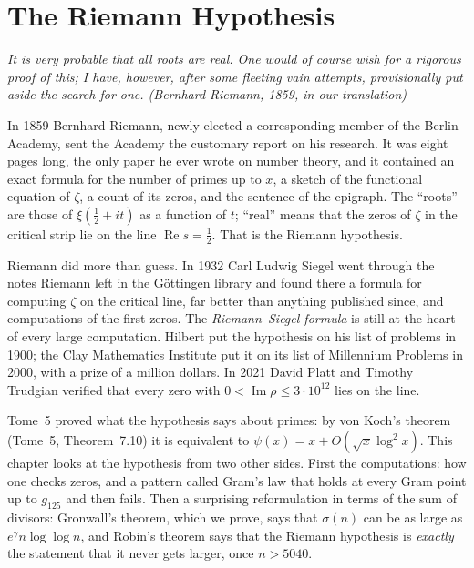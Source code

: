 \chapter{The Riemann Hypothesis}\label{conjectures:ch:riemann}

\begin{center}\itshape
It is very probable that all roots are real. One would of course wish for a rigorous proof of this; I have, however, after some fleeting vain attempts,
provisionally put aside the search for one.
\upshape(Bernhard Riemann, 1859, in our translation)
\end{center}

In 1859 Bernhard Riemann, newly elected a corresponding member of the Berlin Academy, sent the Academy the customary report on his research. It was
eight pages long, the only paper he ever wrote on number theory, and it contained an exact formula for the number of primes up to $x$, a sketch of
the functional equation of $\zeta$, a count of its zeros, and the sentence of the epigraph. The ``roots'' are those of $\xi(\frac12+it)$ as a function of
$t$; ``real'' means that the zeros of $\zeta$ in the critical strip lie on the line $\operatorname{Re}s=\frac12$. That is the Riemann hypothesis.

Riemann did more than guess. In 1932 Carl Ludwig Siegel went through the notes Riemann left in the G\"ottingen library and found there a formula for
computing $\zeta$ on the critical line, far better than anything published since, and computations of the first zeros. The \emph{Riemann--Siegel
formula} is still at the heart of every large computation. Hilbert put the hypothesis on his list of problems in 1900; the Clay Mathematics Institute
put it on its list of Millennium Problems in 2000, with a prize of a million dollars. In 2021 David Platt and Timothy Trudgian verified that every zero
with $0<\operatorname{Im}\rho\le3\cdot10^{12}$ lies on the line.

Tome~5 proved what the hypothesis says about primes: by von Koch's theorem (Tome~5, Theorem~7.10) it is equivalent to
$\psi(x)=x+O(\sqrt x\log^2x)$. This chapter looks at the hypothesis from two other sides. First the computations: how one checks zeros, and a pattern
called Gram's law that holds at every Gram point up to $g_{125}$ and then fails. Then a surprising reformulation in terms of the sum of divisors: Gronwall's
theorem, which we prove, says that $\sigma(n)$ can be as large as $e^\gamma n\log\log n$, and Robin's theorem says that the Riemann hypothesis is
\emph{exactly} the statement that it never gets larger, once $n>5040$.


